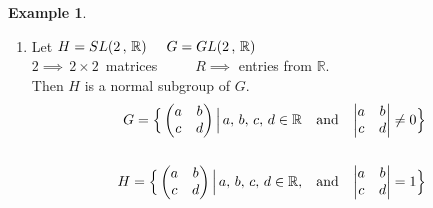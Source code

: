 \documentclass[11pt,a4paper]{article}
\theoremstyle{definition}
\newtheorem{exa}[thm]{Example}
\begin{document}
\begin{exa}
\begin{enumerate}
\begin{proof}
If $G$ is an Abelian group, every subgroup $H$ of $G$ is normal in $G$ since, if $g\in G$, then $gH  = Hg\implies gHg^{-1} = H \implies gHg^{-1} \in H$. Let $h\in H$, then $ghg^{-1} \in H\,\, \forall\, h\in H$. Therefore, $H$ is normal in G.\\
\end{proof}



\item Let $H= SL(2\, ,\, \mathbb{R})\hspace{0.5cm} G = GL(2\, , \, \mathbb{R})$\\

$2 \implies \, 2\times 2\, $ matrices $\hspace{1cm} R \implies $ entries from $\mathbb{R}$.\\

Then $H$ is  a normal subgroup of $G$.
\begin{align*}
G = \Big\{\begin{pmatrix}
a & b\\
c & d\\
\end{pmatrix}\Big|\, a, \, b, \, c, \,  d\in \mathbb{R}\, \hspace{0.3cm} \text{and}\hspace{0.3cm}\begin{vmatrix}
a & b\\
c & d\\
\end{vmatrix} \neq 0\Big\}\\\\
H = \Big\{\begin{pmatrix}
a & b\\
c & d\\
\end{pmatrix}\Big|\, a,\, b,\, c,\, d\in \mathbb{R},\hspace{0.3cm} \text{and}\hspace{0.3cm} \begin{vmatrix}
a & b\\
c & d\\
\end{vmatrix} = 1\Big\}
\end{align*}


\end{enumerate}
\end{exa}
\end{document}
